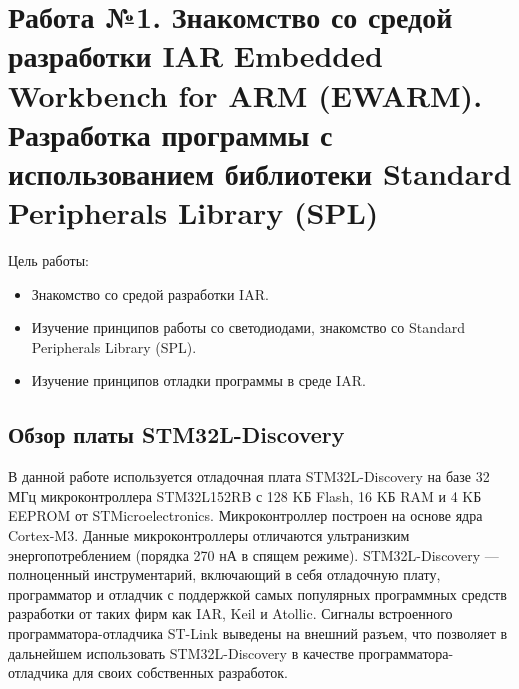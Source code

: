 \chapter{Работа №1. Знакомство со средой разработки IAR Embedded Workbench for ARM (EWARM). Разработка программы с использованием библиотеки Standard Peripherals Library (SPL)}
Цель работы: 
\begin{itemize}
\item Знакомство со средой разработки IAR.
\item Изучение принципов работы со светодиодами, знакомство со Standard Peripherals Library (SPL).
\item Изучение принципов отладки программы в среде IAR.
\end{itemize}
\section{Обзор платы STM32L-Discovery}
В данной работе используется отладочная плата STM32L-Discovery на базе 32 МГц микроконтроллера STM32L152RB с 128 KБ Flash, 16 KБ RAM и 4 KБ EEPROM от STMicroelectronics.  Микроконтроллер построен на основе ядра Cortex-M3. Данные микроконтроллеры отличаются ультранизким энергопотреблением (порядка 270 нА в спящем режиме). STM32L-Discovery --- полноценный инструментарий, включающий в себя отладочную плату, программатор и отладчик с поддержкой самых популярных программных средств разработки от таких фирм как IAR, Keil и Atollic. Сигналы встроенного программатора-отладчика ST-Link выведены на внешний разъем, что позволяет в дальнейшем использовать STM32L-Discovery в качестве программатора-отладчика для своих собственных разработок.

